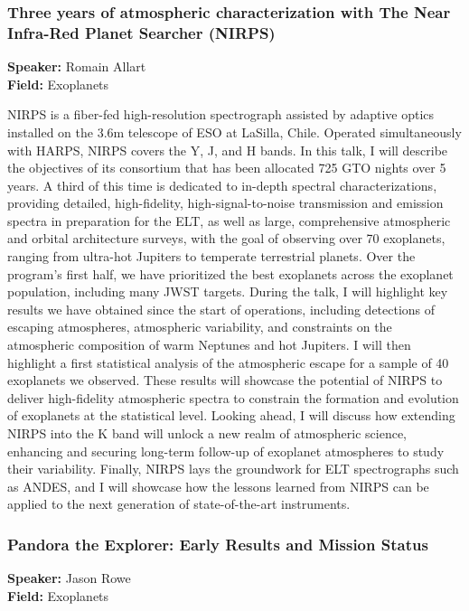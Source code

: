 \hypertarget{abstract-talk-234}{}\label{abstract-page-talk-234}
\subsubsection*{Three years of atmospheric characterization with The Near Infra-Red Planet Searcher (NIRPS)}
\textbf{Speaker:} Romain Allart\\
\textbf{Field:} Exoplanets

NIRPS is a fiber-fed high-resolution spectrograph assisted by adaptive optics installed on the 3.6m telescope of ESO at LaSilla, Chile. Operated simultaneously with HARPS, NIRPS covers the Y, J, and H bands. In this talk, I will describe the objectives of its consortium that has been allocated 725 GTO nights over 5 years. A third of this time is dedicated to in-depth spectral characterizations, providing detailed, high-fidelity, high-signal-to-noise transmission and emission spectra in preparation for the ELT, as well as large, comprehensive atmospheric and orbital architecture surveys, with the goal of observing over 70 exoplanets, ranging from ultra-hot Jupiters to temperate terrestrial planets. Over the program's first half, we have prioritized the best exoplanets across the exoplanet population, including many JWST targets. During the talk, I will highlight key results we have obtained since the start of operations, including detections of escaping atmospheres, atmospheric variability, and constraints on the atmospheric composition of warm Neptunes and hot Jupiters. I will then highlight a first statistical analysis of the atmospheric escape for a sample of 40 exoplanets we observed. These results will showcase the potential of NIRPS to deliver high-fidelity atmospheric spectra to constrain the formation and evolution of exoplanets at the statistical level. Looking ahead, I will discuss how extending NIRPS into the K band will unlock a new realm of atmospheric science, enhancing and securing long-term follow-up of exoplanet atmospheres to study their variability. Finally, NIRPS lays the groundwork for ELT spectrographs such as ANDES, and I will showcase how the lessons learned from NIRPS can be applied to the next generation of state-of-the-art instruments.

\hypertarget{abstract-talk-228}{}\label{abstract-page-talk-228}
\subsubsection*{Pandora the Explorer: Early Results and Mission Status}
\textbf{Speaker:} Jason Rowe\\
\textbf{Field:} Exoplanets

